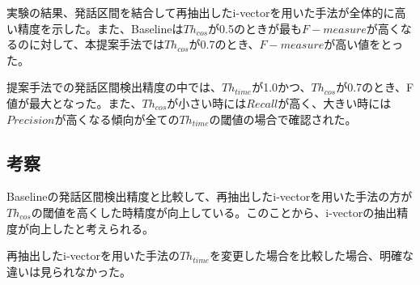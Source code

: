 実験の結果、発話区間を結合して再抽出したi-vectorを用いた手法が全体的に高い精度を示した。また、Baselineは$Th_{cos}$が0.5のときが最も$F-measure$が高くなるのに対して、本提案手法では$Th_{cos}$が0.7のとき、$F-measure$が高い値をとった。\par
提案手法での発話区間検出精度の中では、$Th_{time}$が1.0かつ、$Th_{cos}$が0.7のとき、F値が最大となった。また、$Th_{cos}$が小さい時には$Recall$が高く、大きい時には$Precision$が高くなる傾向が全ての$Th_{time}$の閾値の場合で確認された。

\subsection{考察}
Baselineの発話区間検出精度と比較して、再抽出したi-vectorを用いた手法の方が$Th_{cos}$の閾値を高くした時精度が向上している。このことから、i-vectorの抽出精度が向上したと考えられる。\par
再抽出したi-vectorを用いた手法の$Th_{time}$を変更した場合を比較した場合、明確な違いは見られなかった。
